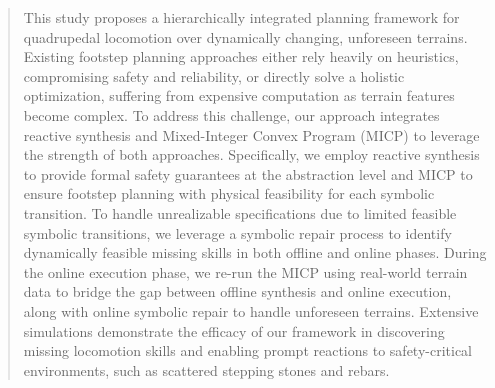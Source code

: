 \documentclass[letterpaper, 10 pt, conference]{ieeeconf}
\begin{document}
\begin{abstract}

This study proposes a hierarchically integrated planning framework for quadrupedal locomotion over dynamically changing, unforeseen terrains.
Existing footstep planning approaches either rely heavily on heuristics, compromising safety and reliability, or directly solve a holistic optimization, suffering from expensive computation as terrain features become complex.
To address this challenge, our approach integrates reactive synthesis and Mixed-Integer Convex Program (MICP) to leverage the strength of both approaches. Specifically, we employ reactive synthesis to provide formal safety guarantees at the abstraction level and MICP to ensure footstep planning with physical feasibility for each symbolic transition.
To handle unrealizable specifications due to limited feasible symbolic transitions, we leverage a 
symbolic repair process to identify dynamically feasible missing skills in both offline and online phases. %
During the online execution phase, we re-run the MICP using real-world terrain data to bridge the gap between offline synthesis and online execution, along with online symbolic repair to handle unforeseen terrains.
Extensive simulations demonstrate the efficacy of our framework in discovering missing locomotion skills and enabling prompt reactions to safety-critical environments, such as scattered stepping stones and rebars.
\end{abstract}
\end{document}

